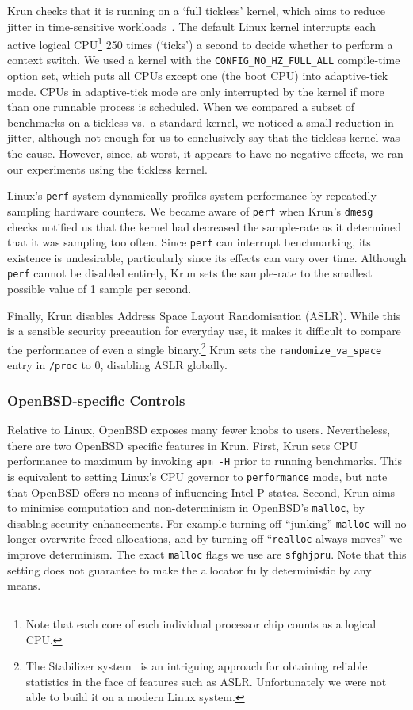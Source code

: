 \documentclass[preprint,numbers,10pt]{sigplanconf}
\newcommand{\krun}{Krun\xspace}
\begin{document}
\krun checks that it is running on a `full tickless' kernel, which aims to reduce
jitter in time-sensitive workloads~\cite{tickless}. The default
Linux kernel interrupts each active logical CPU\footnote{Note that each core of
each individual processor chip counts as a logical CPU.} 250 times (`ticks') a second to
decide whether to perform a context switch. We used a kernel with the
\texttt{CONFIG\_NO\_HZ\_FULL\_ALL} compile-time option set, which puts
all CPUs except one (the boot CPU) into adaptive-tick mode.
CPUs in adaptive-tick mode are only interrupted by the kernel if more than
one runnable process is scheduled.
When we compared a subset of benchmarks on a tickless vs.~a standard
kernel, we noticed a small reduction in jitter, although not enough for us to
conclusively say that the tickless kernel was the cause. However,
since, at worst, it appears to have no negative effects, we ran our experiments
using the tickless kernel.

Linux's \texttt{perf} system dynamically profiles system performance by
repeatedly sampling hardware counters. We became aware of \texttt{perf} when
\krun's \texttt{dmesg} checks notified us that the kernel had decreased the
sample-rate as it determined that it was sampling too often. Since \texttt{perf}
can interrupt benchmarking, its existence is undesirable, particularly since its
effects can vary over time. Although \texttt{perf} cannot be disabled entirely,
\krun sets the sample-rate to the smallest possible value of 1 sample per
second.

Finally, \krun disables Address Space Layout Randomisation (ASLR). While this is
a sensible security precaution for everyday use, it makes it difficult to
compare the performance of even a single binary.\footnote{The Stabilizer
system~\cite{curtsinger13stabilizer} is an intriguing approach for obtaining reliable
statistics in the face of features such as ASLR. Unfortunately we were not able
to build it on a modern Linux system.} \krun sets the
\texttt{randomize\_va\_space} entry in \texttt{/proc} to 0, disabling ASLR
globally.


\subsubsection{OpenBSD-specific Controls}

Relative to Linux, OpenBSD exposes many fewer knobs to users. Nevertheless,
there are two OpenBSD specific features in \krun.
First, \krun sets CPU performance to maximum by invoking \texttt{apm -H} prior
to running benchmarks. This is equivalent to setting Linux's CPU governor to
\texttt{performance} mode, but note that OpenBSD offers no means of influencing
Intel P-states.
Second, \krun aims to minimise computation and non-determinism in OpenBSD's
\texttt{malloc}, by disablng security enhancements. For example turning off
``junking'' \texttt{malloc} will no longer overwrite freed allocations, and by
turning off ``\texttt{realloc} always moves'' we improve determinism. The exact
\texttt{malloc} flags we use are \texttt{sfghjpru}. Note that this setting
does not guarantee to make the allocator fully deterministic by any means.
\end{document}
